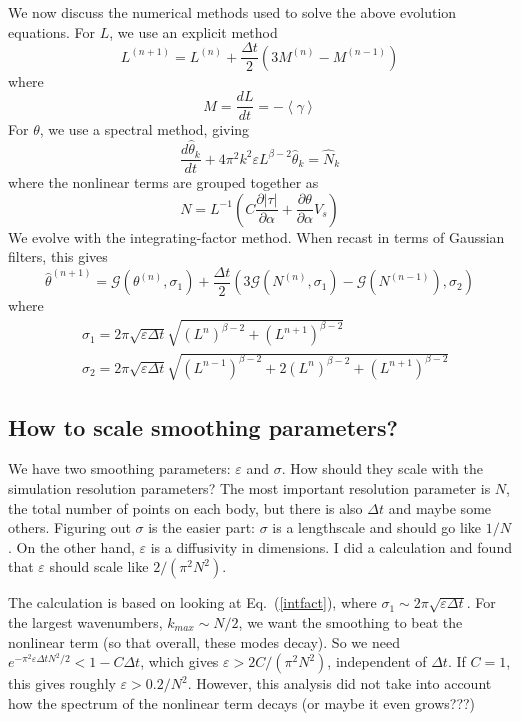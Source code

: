 \documentclass[11pt]{article}
\newcommand{\pd}[2]    { \frac{\partial #1} {\partial #2} }
\newcommand{\td}[2] { \frac{d #1} { d #2 } }
\newcommand{\abs}[1]{\left| #1 \right|}
\newcommand{\mean}[1]{\left< #1 \right>}
\newcommand{\eps}{\varepsilon}
\newcommand{\atau}{\abs{\tau}}
\newcommand{\thh}{\hat{\theta}}
\newcommand{\GG}{\mathcal{G}}
\newcommand{\Dt}{\Delta t}
\begin{document}
We now discuss the numerical methods used to solve the above evolution equations. For $L$, we use an explicit method
\begin{equation}
L^{(n+1)} = L^{(n)} + \frac{\Dt}{2} \left( 3 M^{(n)} - M^{(n-1)} \right)
\end{equation}
where
\begin{equation}
M = \td{L}{t} = -\mean{\gamma}
\end{equation}
For $\theta$, we use a spectral method, giving
\begin{equation}
\td{\thh_k}{t} + 4 \pi^2 k^2 \eps L^{\beta-2} \thh_k = \hat{N}_k
\end{equation}
where the nonlinear terms are grouped together as
\begin{equation}
N = L^{-1} \left( C \pd{\atau}{\alpha} + \pd{\theta}{\alpha} V_s \right)
\end{equation}
We evolve with the integrating-factor method. When recast in terms of Gaussian filters, this gives
\begin{equation}
\label{intfact}
\thh^{(n+1)} = \GG(\theta^{(n)}, \sigma_1) 
+ \frac{\Dt}{2} \left( 3 \GG(N^{(n)}, \sigma_1) - \GG(N^{(n-1)}), \sigma_2 \right)
\end{equation}
where
\begin{align}
& \sigma_1 = 2 \pi \sqrt{\eps \Dt} \sqrt{(L^{n})^{\beta-2} + (L^{n+1})^{\beta-2} } 	\\
& \sigma_2 = 2 \pi \sqrt{\eps \Dt} \sqrt{(L^{n-1})^{\beta-2} + 2 (L^{n})^{\beta-2} + (L^{n+1})^{\beta-2} }
\end{align}

\subsection{How to scale smoothing parameters?}
We have two smoothing parameters: $\eps$ and $\sigma$. How should they scale with the simulation resolution parameters? The most important resolution parameter is $N$, the total number of points on each body, but there is also $\Delta t$ and maybe some others. Figuring out $\sigma$ is the easier part: $\sigma$ is a lengthscale and should go like $1/N$. On the other hand, $\eps$ is a diffusivity in dimensions. I did a calculation and found that $\eps$ should scale like $2/(\pi^2 N^2)$.

The calculation is based on looking at Eq.~(\ref{intfact}), where $\sigma_1 \sim 2 \pi \sqrt{\eps \Delta t}$. For the largest wavenumbers, $k_{max} \sim N/2$, we want the smoothing to beat the nonlinear term (so that overall, these modes decay). So we need $e^{-\pi^2 \eps \Delta t N^2 / 2} < 1 - C\Delta t$, which gives $\eps > 2C/(\pi^2 N^2)$, independent of $\Delta t$. If $C=1$, this gives roughly $\eps > 0.2/ N^2$. However, this analysis did not take into account how the spectrum of the nonlinear term decays (or maybe it even grows???)
\end{document}
